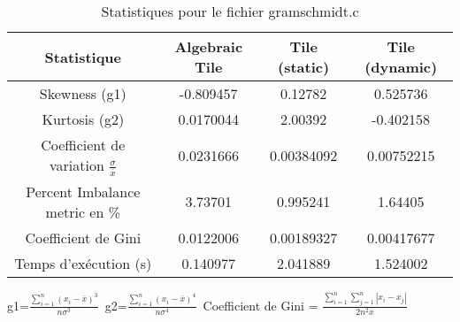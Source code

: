 \documentclass{article}
\begin{document}
\begin{table}[htbp]
  \centering
  \caption{Statistiques pour le fichier gramschmidt.c}
  \begin{tabular}{|c|c|c|c|}
    \hline
    Statistique & Algebraic Tile & Tile (static) & Tile (dynamic) \\ 
    \hline
    Skewness (g1)  & -0.809457 & 0.12782 & 0.525736 \\ 
    Kurtosis (g2)  & 0.0170044 & 2.00392 & -0.402158 \\ 
    Coefficient de variation $ \frac{\sigma}{\overline{x}} $ & 0.0231666 & 0.00384092 & 0.00752215\\ 
    Percent Imbalance metric en \% & 3.73701 & 0.995241 & 1.64405\\ 
    Coefficient de Gini  & 0.0122006 & 0.00189327 & 0.00417677\\ 
    Temps d'exécution (s) &  0.140977 &  2.041889   &  1.524002   \\ 

    \hline
  \end{tabular}
\end{table}\newline
g1=$ \frac{\sum_{i=1}^{n} (x_i - \overline{x})^3}{n\sigma^3} $\
g2=$ \frac{\sum_{i=1}^{n} (x_i - \overline{x})^4}{n\sigma^4} $\
Coefficient de Gini = $ \frac{\sum_{i=1}^{n}\sum_{j=1}^{n} |x_i - x_j|}{2n^2\overline{x}} $\
\newpage

  
\end{document}

